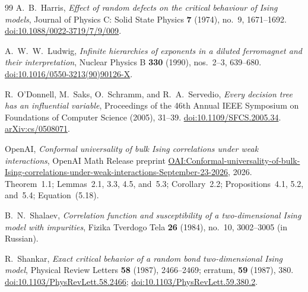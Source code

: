 \begin{thebibliography}{99}
A.~B.~Harris,
\emph{Effect of random defects on the critical behaviour of Ising models},
Journal of Physics C: Solid State Physics \textbf{7} (1974), no.~9,
1671--1692.
\href{https://doi.org/10.1088/0022-3719/7/9/009}{doi:10.1088/0022-3719/7/9/009}.

A.~W.~W.~Ludwig,
\emph{Infinite hierarchies of exponents in a diluted ferromagnet and
their interpretation},
Nuclear Physics B \textbf{330} (1990), nos.~2--3, 639--680.
\href{https://doi.org/10.1016/0550-3213(90)90126-X}{doi:10.1016/0550-3213(90)90126-X}.

R.~O'Donnell, M.~Saks, O.~Schramm, and R.~A.~Servedio,
\emph{Every decision tree has an influential variable},
Proceedings of the 46th Annual IEEE Symposium on Foundations of
Computer Science (2005), 31--39.
\href{https://doi.org/10.1109/SFCS.2005.34}{doi:10.1109/SFCS.2005.34}.
\href{https://arxiv.org/abs/cs/0508071}{arXiv:cs/0508071}.

OpenAI,
\emph{Conformal universality of bulk Ising correlations under weak interactions},
OpenAI Math Release preprint
\href{https://github.com/openai/math/blob/main/preprints/Conformal-universality-of-bulk-Ising-correlations-under-weak-interactions-September-23-2026/paper.pdf}{OAI:Conformal-universality-of-bulk-Ising-correlations-under-weak-interactions-September-23-2026},
2026.
Theorem~1.1; Lemmas~2.1, 3.3, 4.5, and~5.3;
Corollary~2.2; Propositions~4.1, 5.2, and~5.4; Equation~(5.18).

B.~N.~Shalaev,
\emph{Correlation function and susceptibility of a two-dimensional
Ising model with impurities},
Fizika Tverdogo Tela \textbf{26} (1984), no.~10, 3002--3005 (in Russian).

R.~Shankar,
\emph{Exact critical behavior of a random bond two-dimensional Ising model},
Physical Review Letters \textbf{58} (1987), 2466--2469;
erratum, \textbf{59} (1987), 380.
\href{https://doi.org/10.1103/PhysRevLett.58.2466}{doi:10.1103/PhysRevLett.58.2466};
\href{https://doi.org/10.1103/PhysRevLett.59.380.2}{doi:10.1103/PhysRevLett.59.380.2}.

\end{thebibliography}
